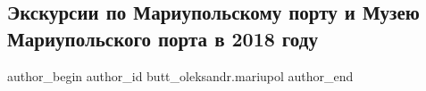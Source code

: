  
 
 
 
 

\subsection{Экскурсии по Мариупольскому порту и Музею Мариупольского порта в 2018 году}
\label{sec:24_01_2023.fb.butt_oleksandr.mariupol.1.ekskursii_po_mariupo}

\ifcmt
 author_begin
   author_id butt_oleksandr.mariupol
 author_end
\fi
